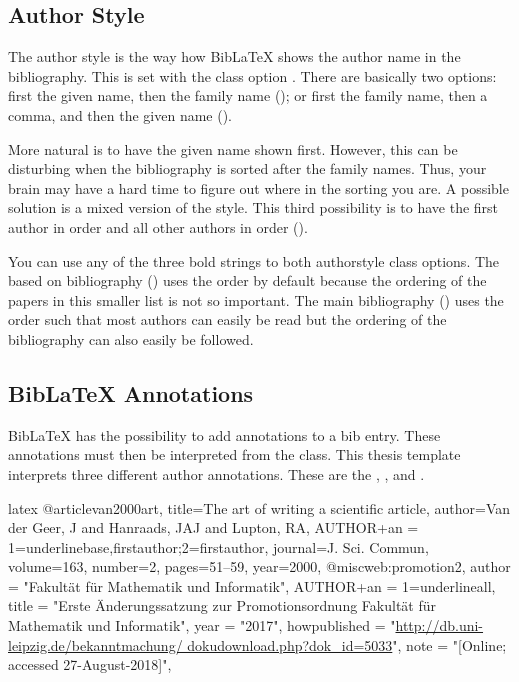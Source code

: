\subsection{Author Style}%
\label{sub:author}

The author style is the way how BibLaTeX shows the author name in the
bibliography. This is set with the class option
.  There are basically two
options: first the given name, then the family name (); or first
the family name, then a comma, and then the given name ().

More natural is to have the given name shown first. However, this can be
disturbing when the  bibliography is sorted after the family names. Thus, your
brain may have a hard time to figure out where in the sorting you are. A
possible solution is a mixed version of the style. This third possibility is
to have the first author in  order and all other authors in
 order ().

You can use any of the three bold strings to both authorstyle class options.
The based on bibliography () uses the 
order by default because the ordering of the papers in this smaller list is
not so important. The main bibliography () uses the
 order such that most authors can easily be read but the ordering
of the bibliography can also easily be followed.

\subsection{BibLaTeX Annotations}%
\label{sub:annotation}

BibLaTeX has the possibility to add annotations to a bib entry. These
annotations must then be interpreted from the class. This thesis template
interprets three different author annotations. These are the
, , and .

\begin{algorithm}
    \caption{An example how to use author annotations.}%
    \label{alg:annotations}
    \begin{code}{latex}
@article{van2000art,
    title={The art of writing a scientific article},
    author={Van der Geer, J and Hanraads, JAJ and Lupton, RA},
    AUTHOR+an = {1=underlinebase,firstauthor;2=firstauthor},
    journal={J. Sci. Commun},
    volume={163},
    number={2},
    pages={51--59},
    year={2000},
}
@misc{web:promotion2,
    author = "{Fakultät für Mathematik und Informatik}",
    AUTHOR+an = {1=underlineall},
    title = "Erste Änderungssatzung zur Promotionsordnung Fakultät für
              Mathematik und Informatik",
    year = "2017",
    howpublished = "\url{http://db.uni-leipzig.de/bekanntmachung/
                          dokudownload.php?dok_id=5033}",
    note = "[Online; accessed 27-August-2018]",
}
    \end{code}
\end{algorithm}


